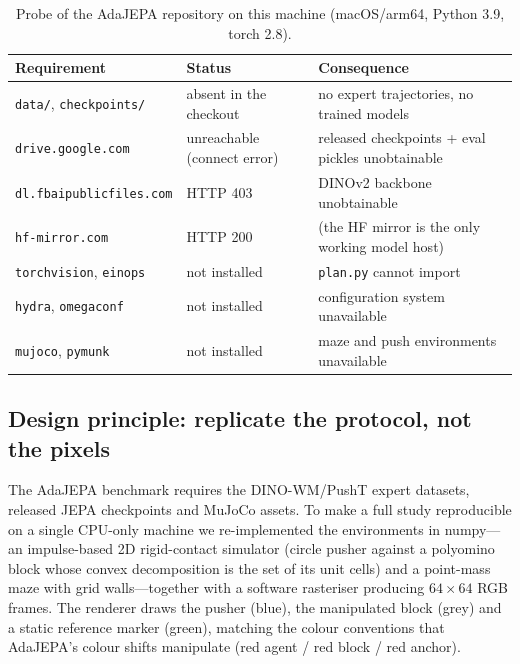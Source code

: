 \begin{table}[t]
\centering
\caption{Probe of the AdaJEPA repository on this machine (macOS/arm64, Python 3.9, torch 2.8).}
\label{tab:probe}
\begin{tabular}{lll}
\toprule
Requirement & Status & Consequence \\
\midrule
\texttt{data/}, \texttt{checkpoints/} & absent in the checkout & no expert trajectories, no trained models \\
\texttt{drive.google.com} & unreachable (connect error) & released checkpoints + eval pickles unobtainable \\
\texttt{dl.fbaipublicfiles.com} & HTTP 403 & DINOv2 backbone unobtainable \\
\texttt{hf-mirror.com} & HTTP 200 & (the HF mirror is the only working model host) \\
\texttt{torchvision}, \texttt{einops} & not installed & \texttt{plan.py} cannot import \\
\texttt{hydra}, \texttt{omegaconf} & not installed & configuration system unavailable \\
\texttt{mujoco}, \texttt{pymunk} & not installed & maze and push environments unavailable \\
\bottomrule
\end{tabular}
\end{table}

\subsection{Design principle: replicate the protocol, not the pixels}

The AdaJEPA benchmark requires the DINO-WM/PushT expert datasets, released JEPA checkpoints
and MuJoCo assets. To make a full study reproducible on a single CPU-only machine we
re-implemented the environments in numpy---an impulse-based 2D rigid-contact simulator
(circle pusher against a polyomino block whose convex decomposition is the set of its unit
cells) and a point-mass maze with grid walls---together with a software rasteriser producing
$64{\times}64$ RGB frames. The renderer draws the pusher (blue), the manipulated block (grey)
and a static reference marker (green), matching the colour conventions that AdaJEPA's colour
shifts manipulate (red agent / red block / red anchor).

